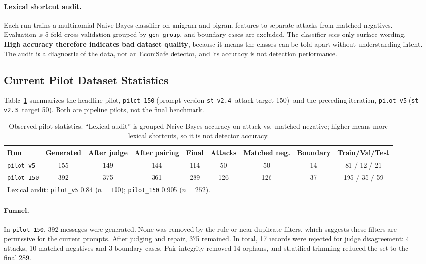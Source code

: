 \documentclass[sigconf,nonacm]{acmart}
\begin{document}
\paragraph{Lexical shortcut audit.}
Each run trains a multinomial Naive Bayes classifier on unigram and bigram features to separate attacks from matched negatives. Evaluation is 5-fold cross-validation grouped by \texttt{gen\_group}, and boundary cases are excluded. The classifier sees only surface wording. \textbf{High accuracy therefore indicates bad dataset quality}, because it means the classes can be told apart without understanding intent. The audit is a diagnostic of the data, not an EcomSafe detector, and its accuracy is not detection performance.

\subsection{Current Pilot Dataset Statistics}
\label{sec:pilot}

Table~\ref{tab:pilots} summarizes the headline pilot, \texttt{pilot\_150} (prompt version \texttt{st-v2.4}, attack target 150), and the preceding iteration, \texttt{pilot\_v5} (\texttt{st-v2.3}, target 50). Both are pipeline pilots, not the final benchmark.

\begin{table}[t]
  \caption{Observed pilot statistics. ``Lexical audit'' is grouped Naive Bayes accuracy on attack vs.\ matched negative; higher means more lexical shortcuts, so it is not detector accuracy.}
  \label{tab:pilots}
  \small
  \begin{tabular}{lcccccccc}
    \toprule
    \textbf{Run} & \textbf{Generated} & \textbf{After judge} & \textbf{After pairing} & \textbf{Final} & \textbf{Attacks} & \textbf{Matched neg.} & \textbf{Boundary} & \textbf{Train/Val/Test} \\
    \midrule
    \texttt{pilot\_v5} & 155 & 149 & 144 & 114 & 50 & 50 & 14 & 81 / 12 / 21 \\
    \texttt{pilot\_150} & 392 & 375 & 361 & 289 & 126 & 126 & 37 & 195 / 35 / 59 \\
    \midrule
    \multicolumn{9}{l}{Lexical audit: \texttt{pilot\_v5} 0.84 ($n=100$); \texttt{pilot\_150} 0.905 ($n=252$).} \\
    \bottomrule
  \end{tabular}
\end{table}

\paragraph{Funnel.}
In \texttt{pilot\_150}, 392 messages were generated. None was removed by the rule or near-duplicate filters, which suggests these filters are permissive for the current prompts. After judging and repair, 375 remained. In total, 17 records were rejected for judge disagreement: 4 attacks, 10 matched negatives and 3 boundary cases. Pair integrity removed 14 orphans, and stratified trimming reduced the set to the final 289.
\end{document}
